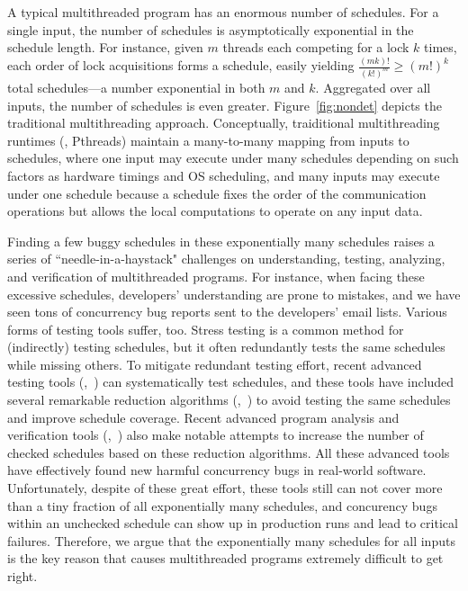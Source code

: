 A typical multithreaded program has an enormous number of schedules.  For
a single input, the number of schedules is asymptotically exponential in
the schedule length.  For instance, given $m$ threads each competing for a
lock $k$ times, each order of lock acquisitions forms a schedule, easily
yielding $\frac{(mk)!}{(k!)^m} \ge (m!)^k$ total schedules---a number
exponential in both $m$ and $k$. Aggregated over all inputs, the number of
schedules is even greater. Figure~\ref{fig:nondet} depicts the traditional
multithreading approach. Conceptually, traiditional multithreading runtimes
(\eg, Pthreads) maintain a many-to-many mapping from inputs to schedules, where
one input may execute under many schedules depending on such factors as hardware
timings and OS scheduling, and many inputs may execute under one schedule
because a schedule fixes the order of the communication operations but allows
the local computations to operate on any input data.

Finding a few buggy schedules in these exponentially many schedules raises
a series of ``needle-in-a-haystack" challenges on understanding, testing,
analyzing, and verification of multithreaded programs. For instance, when facing
these excessive schedules, developers' understanding are prone to mistakes, and
we have seen tons of concurrency bug reports sent to the developers' email
lists. Various forms of testing tools suffer, too.  Stress testing
is a common method for (indirectly) testing schedules, but it often redundantly
tests the same schedules while missing others. To mitigate redundant testing
effort, recent advanced testing tools (\eg,~\cite{musuvathi:chess:osdi08,
modist:nsdi09, dbug:ssv10, demeter:sosp11}) can systematically test schedules,
and these tools have included several remarkable reduction algorithms
(\eg,~\cite{flanagan:dynamicpo, demeter:sosp11}) to avoid testing the same
schedules and improve schedule coverage. Recent advanced program
analysis and verification tools (\eg,~\cite{demeter:sosp11}) also make notable
attempts to increase the number of checked schedules based on these reduction
algorithms. All these advanced tools have effectively found new harmful
concurrency bugs in real-world software. Unfortunately, despite of these great
effort, these tools still can not cover more than a tiny fraction of all
exponentially many schedules, and concurency bugs within an unchecked schedule
can show up in production runs and lead to critical failures. Therefore, we
argue that the exponentially many schedules for all inputs is the key reason
that causes multithreaded programs extremely difficult to get right.


